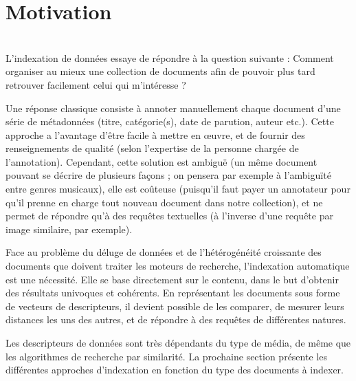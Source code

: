 \documentclass[12pt]{report}
\begin{document}
\section{Motivation}
\begin{frame}

\\
L'indexation de données essaye de répondre à la question suivante : Comment organiser au mieux une collection de documents afin de pouvoir plus tard retrouver facilement celui qui m'intéresse ?

Une réponse classique consiste à annoter manuellement chaque document d'une série de métadonnées (titre, catégorie(s), date de parution, auteur etc.). Cette approche a l'avantage d'être facile à mettre en œuvre, et de fournir des renseignements de qualité (selon l'expertise de la personne chargée de l'annotation). Cependant, cette solution est ambiguë (un même document pouvant se décrire de plusieurs façons ; on pensera par exemple à l'ambiguïté entre genres musicaux), elle est coûteuse (puisqu'il faut payer un annotateur pour qu'il prenne en charge tout nouveau document dans notre collection), et ne permet de répondre qu'à des requêtes textuelles (à l'inverse d'une requête par image similaire, par exemple).

Face au problème du déluge de données et de l'hétérogénéité croissante des documents que doivent traiter les moteurs de recherche, l'indexation automatique est une nécessité. Elle se base directement sur le contenu, dans le but d'obtenir des résultats univoques et cohérents. En représentant les documents sous forme de vecteurs de descripteurs, il devient possible de les comparer, de mesurer leurs distances les uns des autres, et de répondre à des requêtes de différentes natures.

Les descripteurs de données sont très dépendants du type de média, de même que les algorithmes de recherche par similarité. La prochaine section présente les différentes approches d'indexation en fonction du type des documents à indexer.
\end{frame}
\newpage
\end{document}
